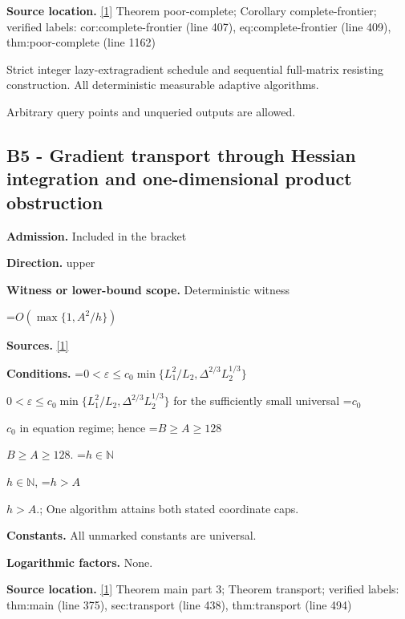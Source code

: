 \documentclass[10pt,a4paper]{article}
\newcommand{\AtlasMath}[1]{\par\begingroup\centering\setbox0=\hbox{$\displaystyle #1$}\ifdim\wd0>1.4\linewidth\typeout{ATLAS WIDE FORMULA: \the\wd0}\fi\ifdim\wd0>\linewidth\resizebox{\linewidth}{!}{\box0}\else\box0\fi\par\endgroup}
\newcommand{\AtlasInlineMath}[1]{\begingroup\setbox0=\hbox{$#1$}\ifdim\wd0>.4\linewidth\endgroup\AtlasMath{#1}\else\endgroup$#1$\fi}
\begin{document}
\textbf{Source location.} \href{https://github.com/WU-Wendao/Colombo/blob/main/colombo_sensorium/Complexity_altas/data/sources/colombo/0904/manuscript.pdf}{[1]} Theorem poor-complete; Corollary complete-frontier; verified labels: cor:complete-frontier (line 407), eq:complete-frontier (line 409), thm:poor-complete (line 1162)



Strict integer lazy-extragradient schedule and sequential full-matrix resisting construction. All deterministic measurable adaptive algorithms.



Arbitrary query points and unqueried outputs are allowed.



\subsection{B5 - Gradient transport through Hessian integration and one-dimensional product obstruction}


\textbf{Admission.} Included in the bracket



\textbf{Direction.} upper



\textbf{Witness or lower-bound scope.} Deterministic witness



\AtlasMath{O\!\left(\max\{1,A^2/h\}\right)}


\textbf{Sources.} \href{https://github.com/WU-Wendao/Colombo/blob/main/colombo_sensorium/Complexity_altas/data/sources/colombo/0904/manuscript.pdf}{[1]}



\textbf{Conditions.} \AtlasInlineMath{0<\varepsilon\le c_0\min\{L_1^2/L_2,\Delta^{2/3}L_2^{1/3}\}} for the sufficiently small universal \AtlasInlineMath{c_0} in equation regime; hence \AtlasInlineMath{B\ge A\ge128}. \AtlasInlineMath{h\in\mathbb N}, \AtlasInlineMath{h>A}.; One algorithm attains both stated coordinate caps.



\textbf{Constants.} All unmarked constants are universal.



\textbf{Logarithmic factors.} None.



\textbf{Source location.} \href{https://github.com/WU-Wendao/Colombo/blob/main/colombo_sensorium/Complexity_altas/data/sources/colombo/0904/manuscript.pdf}{[1]} Theorem main part 3; Theorem transport; verified labels: thm:main (line 375), sec:transport (line 438), thm:transport (line 494)
\end{document}

